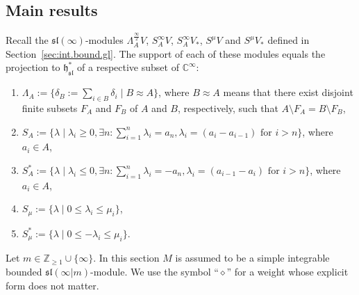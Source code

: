 \documentclass[12pt]{amsart}
\newcommand\C{\mathbb{C}}
\newcommand\Z{\mathbb{Z}}
\newcommand\fh{\mathfrak{h}}
\newcommand\fsl{\mathfrak{sl}}
\theoremstyle{plain}
\theoremstyle{definition}
\numberwithin{equation}{section}
\begin{document}
\subsection{Main results}

Recall the $\fsl(\infty)$-modules $\Lambda_A^{\frac{\infty}{2}}V$, $S_A^\infty V$, $S_A^\infty V_*$, $S^\mu V$ and $S^\mu V_*$ defined in Section~\ref{sec:int.bound.gl}. The support of each of these modules equals the projection to $\fh_\fsl^*$ of a respective subset of $\C^\infty$:
\begin{enumerate} \label{list:types.of.weights}
\item [(i)] \label{list:types.of.weights.exterior}  $\Lambda_A := \{\delta_B:=\sum_{i\in B} \delta_i \mid B\approx A\}$, where $B \approx A$ means that there exist disjoint finite subsets $F_A$ and $F_B$ of $A$ and $B$, respectively, such that $A\setminus F_A = B\setminus F_B$,
\item [(ii)] \label{list:types.of.weights.symmetric}  $S_A := \{\lambda \mid \lambda_i\geq 0, \exists n : \sum_{i=1}^n \lambda_i = a_n, \lambda_i = (a_i - a_{i-1}) \text{ for } i>n\}$, where $a_i\in A$,
\item [(iii)] \label{list:types.of.weights.symmetric.dual}  $S_A^* := \{\lambda \mid \lambda_i\leq 0, \exists n : \sum_{i=1}^n \lambda_i = -a_n, \lambda_i = (a_{i-1} - a_{i}) \text{ for } i>n\}$, where $a_i\in A$,
\item [(iv)] \label{list:types.of.weights.schur}  $S_\mu := \{\lambda \mid 0\leq \lambda_i\leq \mu_i\}$,
\item [(v)] \label{list:types.of.weights.schur.dual}  $S_\mu^* := \{\lambda \mid 0\leq -\lambda_i\leq \mu_i\}$.
\end{enumerate}

Let $m\in \Z_{\geq 1}\cup\{\infty\}$. In this section $M$ is assumed to be a simple integrable bounded $\fsl(\infty|m)$-module. We use the symbol ``$\diamond$'' for a weight whose explicit form does not matter.
\end{document}
